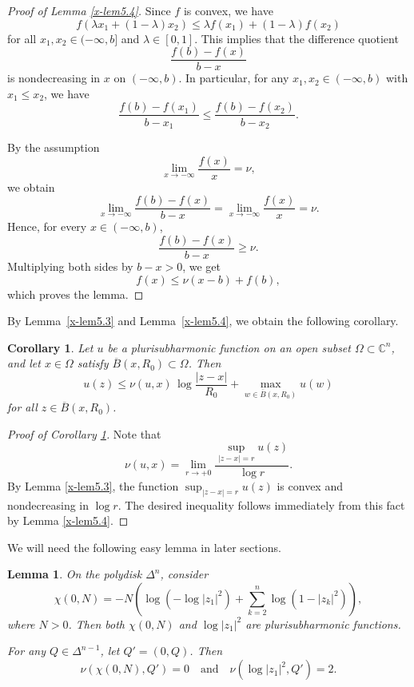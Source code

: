 \documentclass[12pt,twoside]{amsart}
\newtheorem{lem}[thm]{Lemma}
\newtheorem{cor}[thm]{Corollary}
\theoremstyle{definition}
\begin{document}
\begin{proof}[Proof of Lemma \ref{x-lem5.4}]
Since $f$ is convex, we have 
\[
f(\lambda x_1+(1-\lambda)x_2)\le \lambda f(x_1)+(1-\lambda) f(x_2)
\]
for all $x_1, x_2 \in (-\infty, b]$ and $\lambda \in [0,1]$.  
This implies that the difference quotient
\[
\frac{f(b)-f(x)}{b-x}
\]
is nondecreasing in $x$ on $(-\infty, b)$.  
In particular, for any $x_1, x_2 \in (-\infty, b)$ with $x_1 \le x_2$, we have
\[
\frac{f(b)-f(x_1)}{b-x_1} \le \frac{f(b)-f(x_2)}{b-x_2}.
\]

By the assumption 
\[
\lim_{x\to -\infty}\frac{f(x)}{x} = \nu,
\]
we obtain
\[
\lim_{x\to -\infty}\frac{f(b)-f(x)}{b-x} 
= \lim_{x\to -\infty}\frac{f(x)}{x} = \nu.
\]
Hence, for every $x \in (-\infty, b)$,
\[
\frac{f(b)-f(x)}{b-x} \ge \nu.
\]
Multiplying both sides by $b-x > 0$, we get
\[
f(x) \le \nu(x-b) + f(b),
\]
which proves the lemma. 
\end{proof}

By Lemma~\ref{x-lem5.3} and Lemma~\ref{x-lem5.4}, we 
obtain the following corollary.

\begin{cor}\label{x-cor5.5}
Let $u$ be a plurisubharmonic function on an open subset 
$\Omega \subset \mathbb C^n$, and let $x \in \Omega$ satisfy $\overline B(x, R_0) \subset \Omega$. 
Then 
\[
u(z) \le \nu(u, x)\, \log \frac{|z-x|}{R_0} + \max_{w\in \overline B(x, R_0)} u(w)
\]
for all $z \in \overline B(x, R_0)$. 
\end{cor}

\begin{proof}[Proof of Corollary \ref{x-cor5.5}]
Note that 
\[
\nu(u, x) = \lim_{r \to +0} \frac{\sup_{|z-x|=r} u(z)}{\log r}.
\]
By Lemma \ref{x-lem5.3}, the function $\sup_{|z-x|=r} u(z)$ is convex and 
nondecreasing in $\log r$. 
The desired inequality follows immediately from this fact by 
Lemma \ref{x-lem5.4}. 
\end{proof}

We will need the following easy lemma in later sections. 

\begin{lem}\label{x-lem5.6} 
On the polydisk $\Delta^n$, consider 
\[
\chi(0, N) = -N\left( \log(-\log |z_1|^2) + \sum_{k=2}^n \log(1 - |z_k|^2) \right),
\]
where $N > 0$. 
Then both $\chi(0, N)$ and $\log |z_1|^2$ are plurisubharmonic functions. 

For any $Q \in \Delta^{n-1}$, let $Q' = (0, Q)$. 
Then 
\[
\nu(\chi(0, N), Q') = 0 \quad \text{and} \quad  
\nu(\log |z_1|^2, Q') = 2.
\]
\end{lem}
\end{document}
